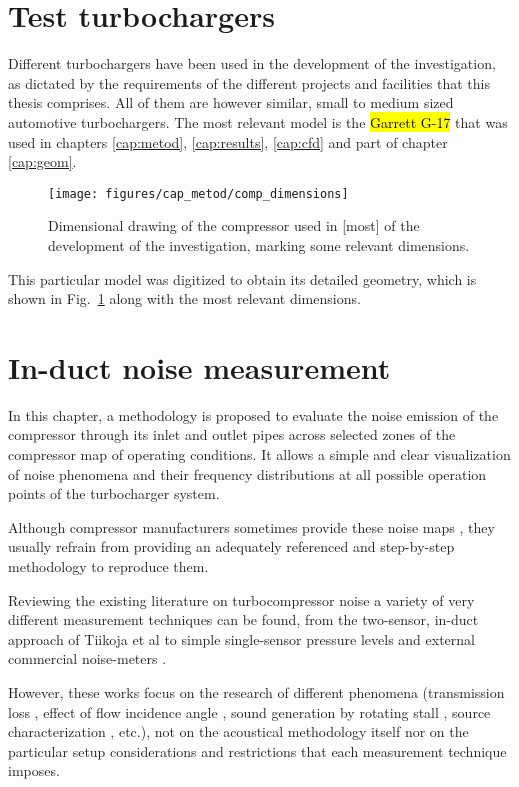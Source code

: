 \section{Test turbochargers}

Different turbochargers have been used in the development of the investigation, as dictated by the requirements of the different projects and facilities that this thesis comprises. All of them are however similar, small to medium sized automotive turbochargers. The most relevant model is the \hl{Garrett G-17} that was used in chapters \ref{cap:metod}, \ref{cap:results}, \ref{cap:cfd} and part of chapter \ref{cap:geom}. 

\begin{figure}[h!]
\centering
\texttt{[image: figures/cap\_metod/comp\_dimensions]}
\caption{Dimensional drawing of the compressor used in [most] of the development of the investigation, marking some relevant dimensions.}
\label{fig:comp_dimens}
\end{figure}

This particular model was digitized to obtain its detailed geometry, which is shown in Fig.~\ref{fig:comp_dimens} along with the most relevant dimensions.

\section{In-duct noise measurement} %

In this chapter, a methodology is proposed to evaluate the noise emission of the compressor through its inlet and outlet pipes across selected zones of the compressor map of operating conditions. It allows a simple and clear visualization of noise phenomena and their frequency distributions at all  possible operation points of the turbocharger system.

Although compressor manufacturers sometimes provide these noise maps \cite{gaude2008experimental}, they usually refrain from providing an adequately referenced and step-by-step methodology to reproduce them.

Reviewing the existing literature on turbocompressor noise a variety of very different measurement techniques can be found, from the two-sensor, in-duct approach of Tiikoja et al \cite{tiikoja2011inves} to simple single-sensor pressure levels and external commercial noise-meters \cite{figurella2012noise}.

However, these works focus on the research of different phenomena (transmission loss \cite{tiikoja2011inves}, effect of flow incidence angle \cite{figurella2012noise}, sound generation by rotating stall \cite{mongeau1993sound}, source characterization \cite{mongeau1995method}, etc.), not on the acoustical methodology itself nor on the particular setup considerations and restrictions that each measurement technique imposes.

